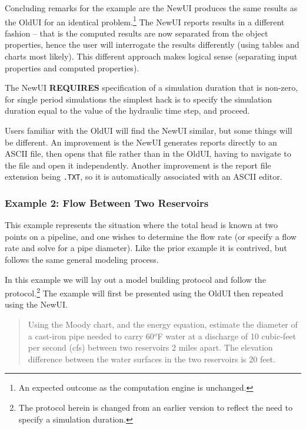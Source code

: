 Concluding remarks for the example are the NewUI produces the same results as the OldUI for an identical problem.\footnote{An expected outcome as the computation engine is unchanged.}
The NewUI reports results in a different fashion -- that is the computed results are now separated from the object properties, hence the user will interrogate the results differently (using tables and charts most likely).  
This different approach makes logical sense (separating input properties and computed properties).

The NewUI \textbf{REQUIRES} specification of a simulation duration that is non-zero, for single period simulations the simplest hack is to specify the simulation duration equal to the value of the hydraulic time step, and proceed.

Users familiar with the OldUI will find the NewUI similar, but some things will be different.
An improvement is the NewUI generates reports directly to an ASCII file, then opens that file rather than in the OldUI, having to navigate to the file and open it independently.   
Another improvement is the report file extension being \texttt{.TXT}, so it is automatically associated with an ASCII editor.
 

\clearpage
\subsubsection{Example 2: Flow Between Two Reservoirs}
This example represents the situation where the total head is known at two points on a pipeline, and one wishes to determine the flow rate (or specify a flow rate and solve for a pipe diameter).   Like the prior example it is contrived, but follows the same general modeling process.

In this example we will lay out a model building protocol and follow the protocol.\footnote{The protocol herein is changed from an earlier version to reflect the need to specify a simulation duration.}
The example will first be presented using the OldUI then repeated using the NewUI.

\begin{quote}
Using the Moody chart, and the energy equation, estimate the diameter of a cast-iron pipe needed to carry 60$^o$F water at a discharge of 10 cubic-feet per second (cfs) between two reservoirs 2 miles apart.  The elevation difference between the water surfaces in the two reservoirs is 20 feet.
\end{quote}

